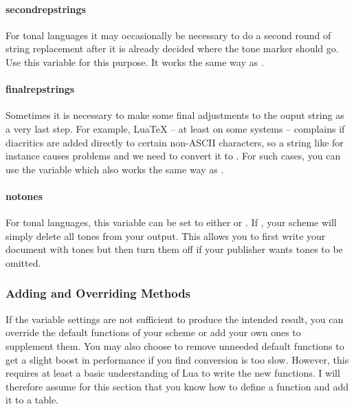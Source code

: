 \documentclass{ltxdockit}
\begin{document}
\paragraph{second\textunderscore{}rep\textunderscore{}strings}

For tonal languages it may occasionally be necessary to do a second round of
string replacement after it is already decided where the tone marker should go.
Use this variable for this purpose. It works the same way as
.

\paragraph{final\textunderscore{}rep\textunderscore{}strings}

Sometimes it is necessary to make some final adjustments to the ouput string as
a very last step. For example, LuaTeX -- at least on some systems -- complains
if diacritics are added directly to certain non-ASCII characters, so a string like
 for instance causes problems and we need to convert
it to . For such cases, you can use
the variable  which also works the same way as
.

\paragraph{no\textunderscore{}tones}

For tonal languages, this variable can be set to either  or
. If , your scheme will simply delete all tones from your
output. This allows you to first write your document with tones but then turn
them off if your publisher wants tones to be omitted.

\subsubsection{Adding and Overriding Methods}

If the variable settings are not sufficient to produce the intended result, you
can override the default functions of your scheme or add your own ones to
supplement them. You may also choose to remove unneeded default functions to get
a slight boost in performance if you find conversion is too slow. However, this
requires at least a basic understanding of Lua to write the new functions. I
will therefore assume for this section that you know how to define a function
and add it to a table.
\end{document}
